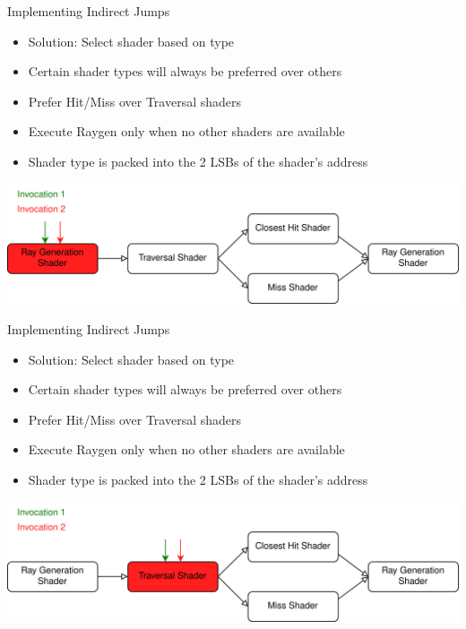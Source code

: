 \documentclass[aspectratio=169,t]{beamer}
\begin{document}
\begin{slide}{Implementing Indirect Jumps}
 \begin{itemize}
  \item Solution: Select shader based on type
  \item Certain shader types will always be preferred over others
  \item Prefer Hit/Miss over Traversal shaders
  \item Execute Raygen only when no other shaders are available
  \item Shader type is packed into the 2 LSBs of the shader's address
 \end{itemize}
 \includegraphics[width=\textwidth]{graphics/RTStages2-1.png}
\end{slide}

\begin{slide}{Implementing Indirect Jumps}
 \begin{itemize}
  \item Solution: Select shader based on type
  \item Certain shader types will always be preferred over others
  \item Prefer Hit/Miss over Traversal shaders
  \item Execute Raygen only when no other shaders are available
  \item Shader type is packed into the 2 LSBs of the shader's address
 \end{itemize}
 \includegraphics[width=\textwidth]{graphics/RTStages2-2.png}
\end{slide}
\end{document}
